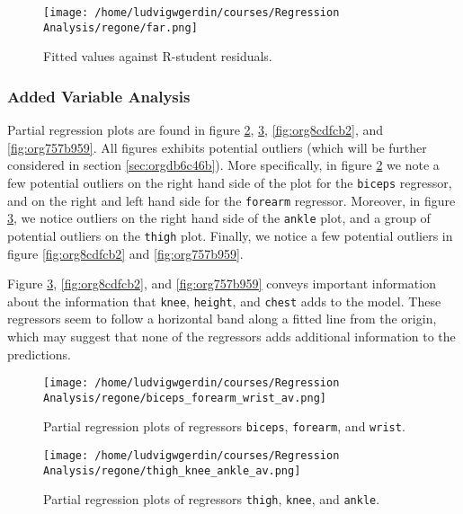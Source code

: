 \documentclass[11pt]{article}
\begin{document}
\begin{figure}[htbp]
\centering
\texttt{[image: /home/ludvigwgerdin/courses/Regression Analysis/regone/far.png]}
\caption{\label{fig:orgb7be586}
Fitted values against R-student residuals.}
\end{figure}

\subsubsection{Added Variable Analysis}
\label{sec:orgbec0ca3}

Partial regression plots are found in figure \ref{fig:org7a24822}, \ref{fig:orgadf4b23},
\ref{fig:org8cdfcb2}, and \ref{fig:org757b959}. All figures exhibits potential outliers 
(which will be further considered in section \ref{sec:orgdb6c46b}).
More specifically, in figure \ref{fig:org7a24822} we note a 
few potential outliers on the right hand side of the plot for the \texttt{biceps} regressor, and on the
right and left hand side for the \texttt{forearm} regressor. Moreover, in figure \ref{fig:orgadf4b23}, we 
notice outliers on the right hand side of the \texttt{ankle} plot, and a group of potential outliers on the
\texttt{thigh} plot. Finally, we notice a few potential outliers in figure \ref{fig:org8cdfcb2} and 
\ref{fig:org757b959}.

Figure \ref{fig:orgadf4b23}, \ref{fig:org8cdfcb2}, and \ref{fig:org757b959} 
conveys important information about the information that \texttt{knee}, \texttt{height}, and
\texttt{chest} adds to the model. These regressors seem to follow a horizontal band along a fitted 
line from the origin, which may suggest that none of the regressors adds additional information 
to the predictions.

\begin{figure}[htbp]
\centering
\texttt{[image: /home/ludvigwgerdin/courses/Regression Analysis/regone/biceps\_forearm\_wrist\_av.png]}
\caption{\label{fig:org7a24822}
Partial regression plots of regressors \texttt{biceps}, \texttt{forearm}, and \texttt{wrist}.}
\end{figure}   

\begin{figure}[htbp]
\centering
\texttt{[image: /home/ludvigwgerdin/courses/Regression Analysis/regone/thigh\_knee\_ankle\_av.png]}
\caption{\label{fig:orgadf4b23}
Partial regression plots of regressors \texttt{thigh}, \texttt{knee}, and \texttt{ankle}.}
\end{figure}
\end{document}
